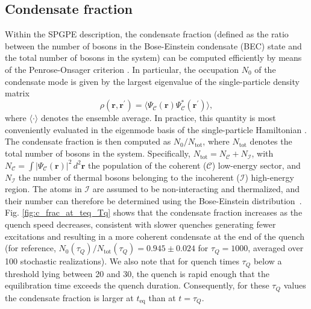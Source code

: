 \documentclass[aps,prl,twocolumn,showpacs,notitlepage,floatfix,superscriptaddress]{revtex4-1}
\begin{document}
\subsection{Condensate fraction}
Within the SPGPE description, the condensate fraction (defined as the ratio between the number of bosons in the 
Bose-Einstein condensate (BEC) 
state and the total number of bosons in the system) can be computed efficiently by means of the Penrose-Onsager criterion \cite{Penrose1956}. In particular, the occupation $N_{0}$ of the condensate mode is given by the largest eigenvalue of the single-particle density matrix
\begin{equation}
    \rho(\boldsymbol{r},\boldsymbol{r}^{\prime}) = \langle \Psi_{\mathcal{C}}(\boldsymbol{r}) \Psi_{\mathcal{C}}^{*}(\boldsymbol{r}^{\prime}) \rangle,
\end{equation}
where $\langle \cdot \rangle$ denotes the ensemble average. In practice, this quantity is most conveniently evaluated in the eigenmode basis of the single-particle Hamiltonian \cite{blakie2008dynamics}.
The condensate fraction is then computed as $N_{0}/N_{\text{tot}}$, where $N_{\text{tot}}$ denotes
the total number of bosons in the system. Specifically, $N_{\text{tot}}=N_{\mathcal{C}} + N_{\mathcal{I}}$, with $N_{\mathcal{C}}=\int |\Psi_{\mathcal{C}}(\boldsymbol{r})|^2\, d^2{\boldsymbol{r}}$ the population of the coherent ($\mathcal{C}$) low-energy sector, and $N_{\mathcal{I}}$ the number of thermal bosons belonging to the incoherent ($\mathcal{I}$) high-energy region. The atoms in $\mathcal{I}$ are assumed to be non-interacting and thermalized, and their number can therefore be determined using the Bose-Einstein distribution~\cite{Liu2020}.
Fig. \ref{fig:c_frac_at_teq_Tq} shows that the condensate fraction increases as the quench speed decreases, consistent with slower quenches generating fewer excitations and resulting in a more coherent condensate at the end of the quench (for reference, $N_0 \left( \tau_Q \right) / N_{\textrm{tot}} \left( \tau_Q \right) = 0.945
\pm 0.024
$ for $\tau_Q = 1000$, averaged over 100 stochastic realizations). We also note that for quench times $\tau_Q$ below a threshold lying between 20 and 30, the quench is rapid enough that the equilibration time exceeds the quench duration. Consequently, for these $\tau_Q$ values the condensate fraction is larger at $t_{\textrm{eq}}$ than at $t = \tau_Q$.
\end{document}
